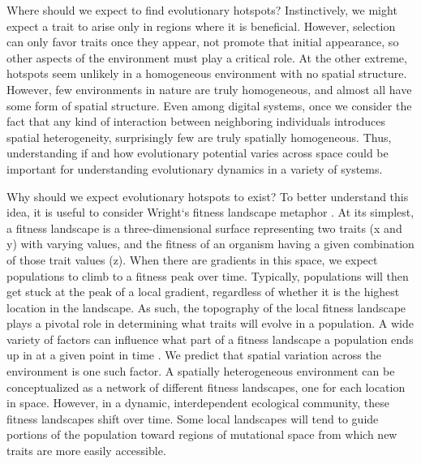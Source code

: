 Where should we expect to find evolutionary hotspots? Instinctively, we might expect a trait to arise only in regions where it is beneficial. However, selection can only favor traits once they appear, not promote that initial appearance, so other aspects of the environment must play a critical role.  At the other extreme, hotspots seem unlikely in a homogeneous environment with no spatial structure.
However, few environments in nature are truly homogeneous, and almost all have some form of spatial structure. Even among digital systems, once we consider the fact that any kind of interaction between neighboring individuals introduces spatial heterogeneity, surprisingly few are truly spatially homogeneous. Thus, understanding if and how evolutionary potential varies across space could be important for understanding evolutionary dynamics in a variety of systems.

Why should we expect evolutionary hotspots to exist? To better understand this idea, it is useful to consider Wright`s fitness landscape metaphor \citep{wright_roles_1932}. At its simplest, a fitness landscape is a three-dimensional surface representing two traits (x and y) with varying values, and the fitness of an organism having a given combination of those trait values (z). When there are gradients in this space, we expect populations to climb to a fitness peak over time. Typically, populations will then get stuck at the peak of a local gradient, regardless of whether it is the highest location in the landscape. As such, the topography of the local fitness landscape plays a pivotal role in determining what traits will evolve in a population. A wide variety of factors can influence what part of a fitness landscape a population ends up in at a given point in time \citep{wilke_evolution_2001}. We predict that spatial variation across the environment is one such factor. A spatially heterogeneous environment can be conceptualized as a network of different fitness landscapes, one for each location in space. However, in a dynamic, interdependent ecological community, these fitness landscapes shift over time. Some local landscapes will tend to guide portions of the population toward regions of mutational space from which new traits are more easily accessible.

